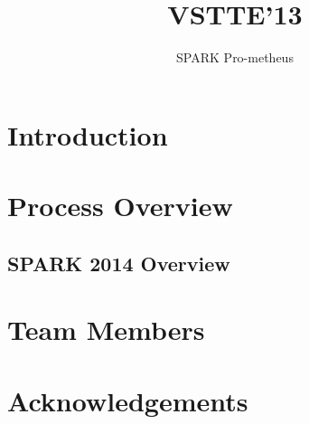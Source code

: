 \documentclass{report}
\title{VSTTE'13}
\author{SPARK Pro-metheus}
\begin{document}
\maketitle

\chapter{Introduction}


\chapter{Process Overview}
\label{ProcessSummary}


\section{SPARK 2014 Overview}


% 


\chapter{Team Members}


\chapter{Acknowledgements}

\end{document}
